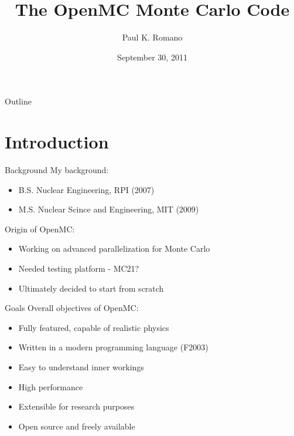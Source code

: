 \documentclass{beamer}
\title{The OpenMC Monte Carlo Code}
\author{Paul K. Romano}
\date{September 30, 2011}
\begin{document}

\frame{\titlepage}

\section[Outline]{}
\begin{frame}{Outline}
  \tableofcontents
\end{frame}

\section{Introduction}

\begin{frame}{Background}
  My background:
  \begin{itemize}
    \item<1-> B.S. Nuclear Engineering, RPI (2007)
    \item<1-> M.S. Nuclear Scince and Engineering, MIT (2009)
  \end{itemize}
  Origin of OpenMC:
  \begin{itemize}
    \item<1-> Working on advanced parallelization for Monte Carlo
    \item<1-> Needed testing platform - MC21?
    \item<1-> Ultimately decided to start from scratch
  \end{itemize}
\end{frame}

\begin{frame}{Goals}
  Overall objectives of OpenMC:
  \begin{itemize}
  \item<1-> Fully featured, capable of realistic physics
  \item<1-> Written in a modern programming language (F2003)
  \item<1-> Easy to understand inner workings
  \item<1-> High performance
  \item<1-> Extensible for research purposes
  \item<1-> Open source and freely available
  \end{itemize}
\end{frame}

\end{document}
